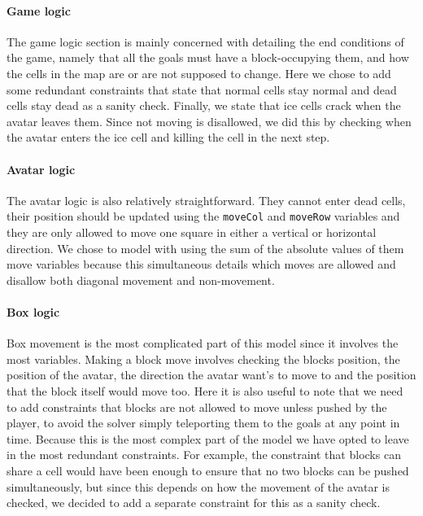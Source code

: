 \documentclass[british]{article}
\newcommand{\code}[1]{\texttt{#1}}
\begin{document}
	\paragraph{Game logic} The game logic section is mainly concerned with detailing the end conditions of the game, namely that all the goals must have a block-occupying them, and how the cells in the map are or are not supposed to change. Here we chose to add some redundant constraints that state that normal cells stay normal and dead cells stay dead as a sanity check. Finally, we state that ice cells crack when the avatar leaves them. Since not moving is disallowed, we did this by checking when the avatar enters the ice cell and killing the cell in the next step.
	
	\paragraph{Avatar logic} The avatar logic is also relatively straightforward. They cannot enter dead cells, their position should be updated using the \code{moveCol} and \code{moveRow} variables and they are only allowed to move one square in either a vertical or horizontal direction. We chose to model with using the sum of the absolute values of them move variables because this simultaneous details which moves are allowed and disallow both diagonal movement and non-movement. 
	
	\paragraph{Box logic} Box movement is the most complicated part of this model since it involves the most variables. Making a block move involves checking the blocks position, the position of the avatar, the direction the avatar want's to move to and the position that the block itself would move too. Here it is also useful to note that we need to add constraints that blocks are not allowed to move unless pushed by the player, to avoid the solver simply teleporting them to the goals at any point in time. Because this is the most complex part of the model we have opted to leave in the most redundant constraints. For example, the constraint that blocks can share a cell would have been enough to ensure that no two blocks can be pushed simultaneously, but since this depends on how the movement of the avatar is checked, we decided to add a separate constraint for this as a sanity check. 
	
	
\end{document}
